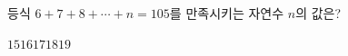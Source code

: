 등식 $6+7+8+\cdots+n=105$를 만족시키는 자연수 $n$의 값은?
\begin{choices32}{$15$}{$16$}{$17$}{$18$}{$19$}\end{choices32}
